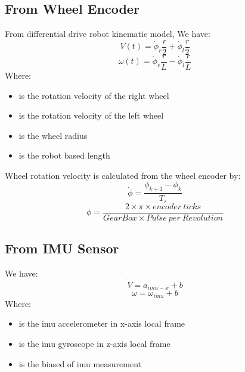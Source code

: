 	\subsection{From Wheel Encoder}
	From differential drive robot kinematic model, We have:
	\begin{equation}
		V(t) = \dot{\phi}_r \frac{r}{2} + \dot{\phi}_l \frac{r}{2}
		\label{sensorfuseq2}
	\end{equation}
	\begin{equation}
		\omega(t) = \dot{\phi}_r \frac{r}{L} - \dot{\phi}_l \frac{r}{L}
		\label{sensorfuseq3}
	\end{equation}
	Where:
	\begin{itemize}
		\item { is the rotation velocity of the right wheel}
		\item { is the rotation velocity of the left wheel}
		\item { is the wheel radius}
		\item { is the robot based length}
	\end{itemize}
	Wheel rotation velocity is calculated from the wheel encoder by:
	\begin{equation}
		\dot{\phi} = \frac{\phi_{k+1} - \phi_{k}}{T_s}
		\label{sensorfuseq4}
	\end{equation}
	\begin{equation}
		\phi = \frac{2 \times \pi \times encoder\ ticks}{Gear Box \times Pulse\ per\ Revolution}
		\label{sensorfuseq5}
	\end{equation}
	\subsection{From IMU Sensor}
	We have:
	\begin{equation}
		\dot{V} = a_{imu-x} + b
		\label{sensorfuseq6}
	\end{equation}
	\begin{equation}
		\omega = \omega_{imu} + b
		\label{sensorfuseq7}
	\end{equation}
	Where:
	\begin{itemize}
		\item { is the imu accelerometer in x-axis local frame }
		\item { is the imu gyroscope in z-axis local frame}
		\item { is the biased of imu measurement}
	\end{itemize}
